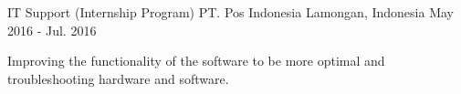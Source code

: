 \begin{cventries}
  \cventry
    {IT Support (Internship Program)} %
    {PT. Pos Indonesia} %
    {Lamongan, Indonesia} %
    {May 2016 - Jul. 2016} %
    {
      \begin{cvitems} %
        \item {Improving the functionality of the software to be more optimal and troubleshooting hardware and software.}
      \end{cvitems}
    }


\end{cventries}

